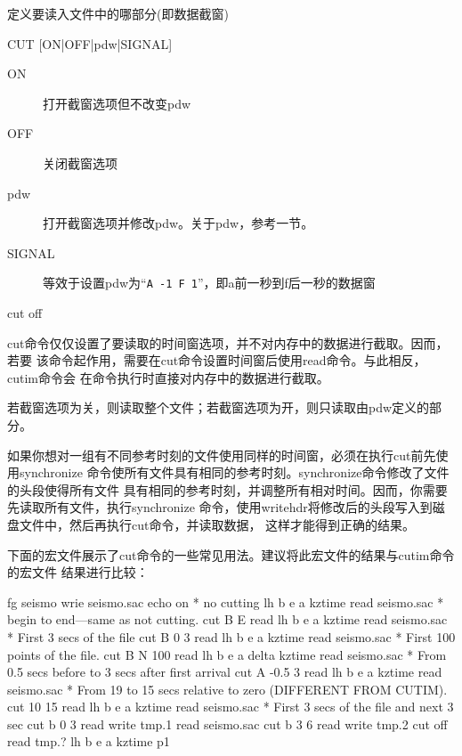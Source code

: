\label{cmd:cut}

定义要读入文件中的哪部分(即数据截窗)

\begin{SACSTX}
CUT [ON|OFF|pdw|SIGNAL]
\end{SACSTX}

\begin{description}
\item [ON] 打开截窗选项但不改变pdw
\item [OFF] 关闭截窗选项
\item [pdw] 打开截窗选项并修改pdw。关于pdw，参考一节。
\item [SIGNAL] 等效于设置pdw为``\verb+A -1 F 1+''，即a前一秒到f后一秒的数据窗
\end{description}

\begin{SACDFT}
cut off
\end{SACDFT}

cut命令仅仅设置了要读取的时间窗选项，并不对内存中的数据进行截取。因而，若要
该命令起作用，需要在cut命令设置时间窗后使用read命令。与此相反，cutim命令会
在命令执行时直接对内存中的数据进行截取。

若截窗选项为关，则读取整个文件；若截窗选项为开，则只读取由pdw定义的部分。

如果你想对一组有不同参考时刻的文件使用同样的时间窗，必须在执行cut前先使用synchronize
命令使所有文件具有相同的参考时刻。synchronize命令修改了文件的头段使得所有文件
具有相同的参考时刻，并调整所有相对时间。因而，你需要先读取所有文件，执行synchronize
命令，使用writehdr将修改后的头段写入到磁盘文件中，然后再执行cut命令，并读取数据，
这样才能得到正确的结果。

下面的宏文件展示了cut命令的一些常见用法。建议将此宏文件的结果与cutim命令的宏文件
结果进行比较：
\begin{SACCode}
fg seismo
wrie seismo.sac
echo on
* no cutting
lh b e a kztime
read seismo.sac
* begin to end---same as not cutting.
cut B E
read
lh b e a kztime
read seismo.sac
* First 3 secs of the file
cut B 0 3
read
lh b e a kztime
read seismo.sac
* First 100 points of the file.
cut B N 100
read
lh b e a delta kztime
read seismo.sac
* From 0.5 secs before to 3 secs after first arrival
cut A -0.5 3
read
lh b e a kztime
read seismo.sac
* From 19 to 15 secs relative to zero (DIFFERENT FROM CUTIM).
cut 10 15
read
lh b e a kztime
read seismo.sac
* First 3 secs of the file and next 3 sec
cut b 0 3
read
write tmp.1
read seismo.sac
cut b 3 6
read
write tmp.2
cut off
read tmp.?
lh b e a kztime
p1
\end{SACCode}

